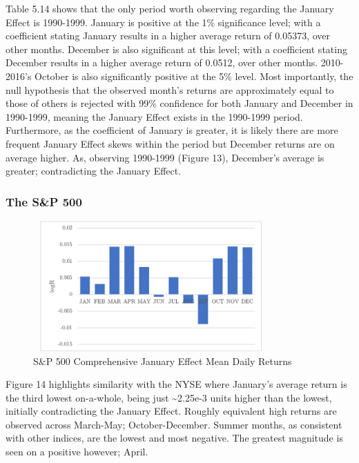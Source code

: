 \documentclass[11pt, english]{article}
\begin{document}
	Table 5.14 shows that the only period worth observing regarding the January Effect is 1990-1999. January is positive at the 1\% significance level; with a coefficient stating January results in a higher average return of 0.05373, over other months. December is also significant at this level; with a coefficient stating December results in a higher average return of 0.0512, over other months. 2010-2016’s October is also significantly positive at the 5\% level. Most importantly, the null hypothesis that the observed month’s returns are approximately equal to those of others is rejected with 99\% confidence for both January and December in 1990-1999, meaning the January Effect exists in the 1990-1999 period. Furthermore, as the coefficient of January is greater, it is likely there are more frequent January Effect skews within the period but December returns are on average higher. As, observing 1990-1999 (Figure 13), December’s average is greater; contradicting the January Effect.

		\subsubsection{The S\&P 500}

	\begin{figure}[H]
        \begin{center}
                \includegraphics[width=9cm,height=5cm]{SP-JE1.png} 
		\caption{S\&P 500 Comprehensive January Effect Mean Daily Returns}
        \end{center}
        \end{figure}	

	Figure 14 highlights similarity with the NYSE where January’s average return is the third lowest on-a-whole, being just \~{}2.25e-3 units higher than the lowest, initially contradicting the January Effect. Roughly equivalent high returns are observed across March-May; October-December. Summer months, as consistent with other indices, are the lowest and most negative. The greatest magnitude is seen on a positive however; April.
\end{document}
